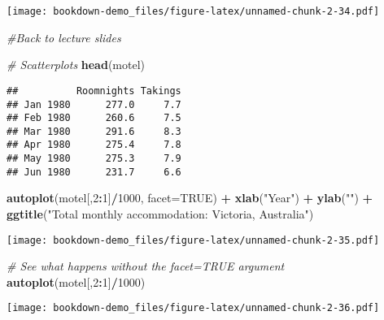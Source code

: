\documentclass[]{book}
\newenvironment{Shaded}{\begin{snugshade}}{\end{snugshade}}
\newcommand{\CommentTok}[1]{\textcolor[rgb]{0.56,0.35,0.01}{\textit{#1}}}
\newcommand{\DataTypeTok}[1]{\textcolor[rgb]{0.13,0.29,0.53}{#1}}
\newcommand{\DecValTok}[1]{\textcolor[rgb]{0.00,0.00,0.81}{#1}}
\newcommand{\KeywordTok}[1]{\textcolor[rgb]{0.13,0.29,0.53}{\textbf{#1}}}
\newcommand{\NormalTok}[1]{#1}
\newcommand{\OperatorTok}[1]{\textcolor[rgb]{0.81,0.36,0.00}{\textbf{#1}}}
\newcommand{\OtherTok}[1]{\textcolor[rgb]{0.56,0.35,0.01}{#1}}
\newcommand{\StringTok}[1]{\textcolor[rgb]{0.31,0.60,0.02}{#1}}
\begin{document}
\texttt{[image: bookdown-demo\_files/figure-latex/unnamed-chunk-2-34.pdf]}

\begin{Shaded}
\begin{Highlighting}[]
\CommentTok{#Back to lecture slides}
  
\CommentTok{# Scatterplots}
  \KeywordTok{head}\NormalTok{(motel)}
\end{Highlighting}
\end{Shaded}

\begin{verbatim}
##          Roomnights Takings
## Jan 1980      277.0     7.7
## Feb 1980      260.6     7.5
## Mar 1980      291.6     8.3
## Apr 1980      275.4     7.8
## May 1980      275.3     7.9
## Jun 1980      231.7     6.6
\end{verbatim}

\begin{Shaded}
\begin{Highlighting}[]
    \KeywordTok{autoplot}\NormalTok{(motel[,}\DecValTok{2}\OperatorTok{:}\DecValTok{1}\NormalTok{]}\OperatorTok{/}\DecValTok{1000}\NormalTok{, }\DataTypeTok{facet=}\OtherTok{TRUE}\NormalTok{) }\OperatorTok{+}
\StringTok{    }\KeywordTok{xlab}\NormalTok{(}\StringTok{"Year"}\NormalTok{) }\OperatorTok{+}\StringTok{ }\KeywordTok{ylab}\NormalTok{(}\StringTok{""}\NormalTok{) }\OperatorTok{+}
\StringTok{    }\KeywordTok{ggtitle}\NormalTok{(}\StringTok{"Total monthly accommodation: Victoria, Australia"}\NormalTok{)}
\end{Highlighting}
\end{Shaded}

\texttt{[image: bookdown-demo\_files/figure-latex/unnamed-chunk-2-35.pdf]}

\begin{Shaded}
\begin{Highlighting}[]
    \CommentTok{# See what happens without the facet=TRUE argument}
    \KeywordTok{autoplot}\NormalTok{(motel[,}\DecValTok{2}\OperatorTok{:}\DecValTok{1}\NormalTok{]}\OperatorTok{/}\DecValTok{1000}\NormalTok{)}
\end{Highlighting}
\end{Shaded}

\texttt{[image: bookdown-demo\_files/figure-latex/unnamed-chunk-2-36.pdf]}

\begin{Shaded}
\end{Shaded}
\end{document}
